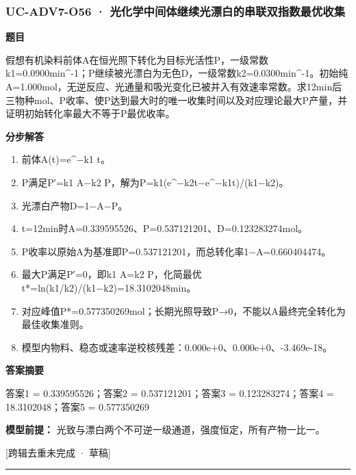 \documentclass[UTF8,11pt,a4paper]{ctexart}
\begin{document}
\subsubsection*{UC-ADV7-O56 · 光化学中间体继续光漂白的串联双指数最优收集}
\noindent\textbf{题目}\par
假想有机染料前体A在恒光照下转化为目标光活性P，一级常数k1=0.0900min\textasciicircum{}-1；P继续被光漂白为无色D，一级常数k2=0.0300min\textasciicircum{}-1。初始纯A=1.000mol，无逆反应、光通量和吸光变化已被并入有效速率常数。求12min后三物种mol、P收率、使P达到最大时的唯一收集时间以及对应理论最大P产量，并证明初始转化率最大不等于P最优收率。\par
\medskip\noindent\textbf{分步解答}
\begin{enumerate}
\item 前体A(t)=e\textasciicircum{}−k1 t。
\item P满足P′=k1 A−k2 P，解为P=k1(e\textasciicircum{}−k2t−e\textasciicircum{}−k1t)/(k1−k2)。
\item 光漂白产物D=1−A−P。
\item t=12min时A=0.339595526、P=0.537121201、D=0.123283274mol。
\item P收率以原始A为基准即P=0.537121201，而总转化率1−A=0.660404474。
\item 最大P满足P′=0，即k1 A=k2 P，化简最优t*=ln(k1/k2)/(k1−k2)=18.3102048min。
\item 对应峰值P*=0.577350269mol；长期光照导致P→0，不能以A最终完全转化为最佳收集准则。
\item 模型内物料、稳态或速率逆校核残差：0.000e+0、0.000e+0、-3.469e-18。
\end{enumerate}
\noindent\textbf{答案摘要}\par
答案1 = 0.339595526；答案2 = 0.537121201；答案3 = 0.123283274；答案4 = 18.3102048；答案5 = 0.577350269\par
\noindent\textbf{模型前提：}
光致与漂白两个不可逆一级通道，强度恒定，所有产物一比一。\par
\noindent\textcolor{red!65!black}{[跨辑去重未完成 · 草稿]} \par
\medskip\hrule\medskip
{}
\end{document}
